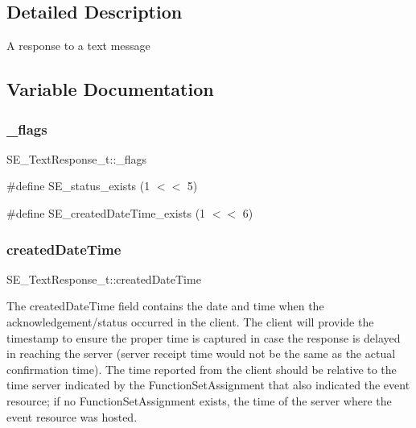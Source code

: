 \subsection{Detailed Description}
A response to a text message 

\subsection{Variable Documentation}
\mbox{\label{group__TextResponse_gacb1bf1b7276dc2a59fed4f769e923a62}} 
\subsubsection{\texorpdfstring{\+\_\+flags}{\_flags}}
{\footnotesize\ttfamily S\+E\+\_\+\+Text\+Response\+\_\+t\+::\+\_\+flags}

\#define S\+E\+\_\+status\+\_\+exists (1 $<$$<$ 5)

\#define S\+E\+\_\+created\+Date\+Time\+\_\+exists (1 $<$$<$ 6) \mbox{\label{group__TextResponse_gae6f82efd8b9863fc334ac5e17051c4a6}} 
\subsubsection{\texorpdfstring{created\+Date\+Time}{createdDateTime}}
{\footnotesize\ttfamily S\+E\+\_\+\+Text\+Response\+\_\+t\+::created\+Date\+Time}

The created\+Date\+Time field contains the date and time when the acknowledgement/status occurred in the client. The client will provide the timestamp to ensure the proper time is captured in case the response is delayed in reaching the server (server receipt time would not be the same as the actual confirmation time). The time reported from the client should be relative to the time server indicated by the Function\+Set\+Assignment that also indicated the event resource; if no Function\+Set\+Assignment exists, the time of the server where the event resource was hosted. \mbox{\label{group__TextResponse_gaf6d8ec98b273a16ab08cc67d7646c0d3}} 
